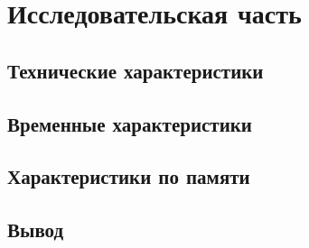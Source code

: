 \section{Исследовательская часть}


\subsection{Технические характеристики}


\subsection{Временные характеристики}


\subsection{Характеристики по памяти}


\subsection*{Вывод}

